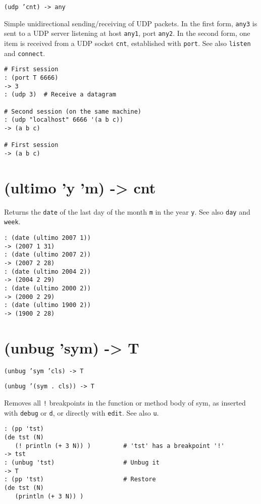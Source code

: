 {{{{{{{{\texttt{(udp 'cnt) -> any}

Simple unidirectional sending/receiving of UDP packets. In the first
form, \texttt{any3} is sent to a UDP server listening at host \texttt{any1}, port
\texttt{any2}. In the second form, one item is received from a UDP socket
\texttt{cnt}, established with \texttt{port}. See also \texttt{listen} and \texttt{connect}.


\begin{verbatim}
# First session
: (port T 6666)
-> 3
: (udp 3)  # Receive a datagram

# Second session (on the same machine)
: (udp "localhost" 6666 '(a b c))
-> (a b c)

# First session
-> (a b c)
\end{verbatim}

 
\section{(ultimo 'y 'm) -> cnt}
\label{sec-8-1-21-5}


Returns the \texttt{date} of the last day of the month \texttt{m} in the year \texttt{y}. See
also \texttt{day} and \texttt{week}.


\begin{verbatim}
: (date (ultimo 2007 1))
-> (2007 1 31)
: (date (ultimo 2007 2))
-> (2007 2 28)
: (date (ultimo 2004 2))
-> (2004 2 29)
: (date (ultimo 2000 2))
-> (2000 2 29)
: (date (ultimo 1900 2))
-> (1900 2 28)
\end{verbatim}

 
\section{(unbug 'sym) -> T}
\label{sec-8-1-21-6}


\texttt{(unbug 'sym 'cls) -> T}

\texttt{(unbug '(sym . cls)) -> T}

Removes all \texttt{!} breakpoints in the function or method body of sym, as
inserted with \texttt{debug} or \texttt{d}, or directly with \texttt{edit}. See also \texttt{u}.


\begin{verbatim}
: (pp 'tst)
(de tst (N)
   (! println (+ 3 N)) )         # 'tst' has a breakpoint '!'
-> tst
: (unbug 'tst)                   # Unbug it
-> T
: (pp 'tst)                      # Restore
(de tst (N)
   (println (+ 3 N)) )
\end{verbatim}

}}}}}}}}

